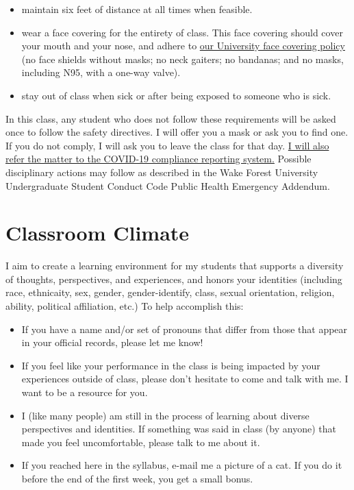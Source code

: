 \documentclass[11pt,]{article}
\providecommand{\tightlist}{%
  \setlength{\itemsep}{0pt}\setlength{\parskip}{0pt}}
\begin{document}
\begin{itemize}
\tightlist
\item
  maintain six feet of distance at all times when feasible.
\item
  wear a face covering for the entirety of class. This face covering
  should cover your mouth and your nose, and adhere to
  \href{https://drive.google.com/file/d/1Hc_yL-Pzec2TdfPTgrC18Cb96vympsbI/view}{our
  University face covering policy} (no face shields without masks; no
  neck gaiters; no bandanas; and no masks, including N95, with a one-way
  valve).
\item
  stay out of class when sick or after being exposed to someone who is
  sick.
\end{itemize}

In this class, any student who does not follow these requirements will
be asked once to follow the safety directives. I will offer you a mask
or ask you to find one. If you do not comply, I will ask you to leave
the class for that day.
\href{https://cm.maxient.com/reportingform.php?WakeForestUniv\&layout_id=40}{I
will also refer the matter to the COVID-19 compliance reporting system.}
Possible disciplinary actions may follow as described in the Wake Forest
University Undergraduate Student Conduct Code Public Health Emergency
Addendum.

\hypertarget{classroom-climate}{%
\section{Classroom Climate}\label{classroom-climate}}

I aim to create a learning environment for my students that supports a
diversity of thoughts, perspectives, and experiences, and honors your
identities (including race, ethnicaity, sex, gender, gender-identify,
class, sexual orientation, religion, ability, political affiliation,
etc.) To help accomplish this:

\begin{itemize}
\item
  If you have a name and/or set of pronouns that differ from those that
  appear in your official records, please let me know!
\item
  If you feel like your performance in the class is being impacted by
  your experiences outside of class, please don't hesitate to come and
  talk with me. I want to be a resource for you.
\item
  I (like many people) am still in the process of learning about diverse
  perspectives and identities. If something was said in class (by
  anyone) that made you feel uncomfortable, please talk to me about it.
\item
  If you reached here in the syllabus, e-mail me a picture of a cat. If
  you do it before the end of the first week, you get a small bonus.
\end{itemize}
\end{document}
